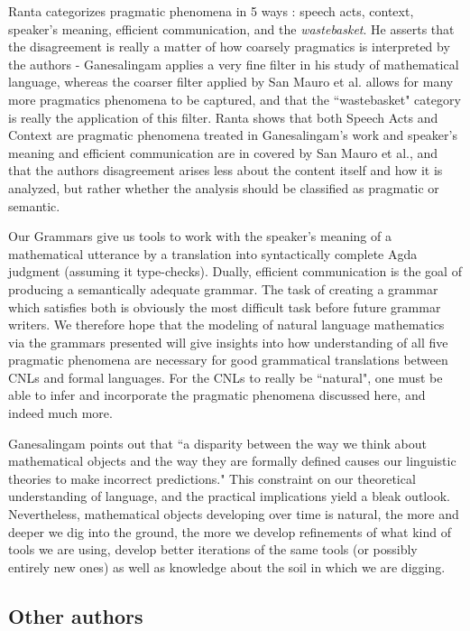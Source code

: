 Ranta categorizes pragmatic phenomena in 5 ways : speech acts, context,
speaker's meaning, efficient communication, and the \emph{wastebasket}. He
asserts that the disagreement is really a matter of how coarsely pragmatics is
interpreted by the authors - Ganesalingam applies a very fine filter in his
study of mathematical language, whereas the coarser filter applied by San Mauro
et al. allows for many more pragmatics phenomena to be captured, and that the
``wastebasket" category is really the application of this filter. Ranta shows
that both Speech Acts and Context are pragmatic phenomena treated in
Ganesalingam's work and speaker's meaning and efficient communication are in
covered by San Mauro et al., and that the authors disagreement arises less about
the content itself and how it is analyzed, but rather whether the analysis
should be classified as pragmatic or semantic.

Our Grammars give us tools to work with the speaker's meaning of a mathematical
utterance by a translation into syntactically complete Agda judgment (assuming
it type-checks). Dually, efficient communication is the goal of producing a
semantically adequate grammar. The task of creating a grammar which satisfies
both is obviously the most difficult task before future grammar writers. We
therefore hope that the modeling of natural language mathematics via the
grammars presented will give insights into how understanding of all five
pragmatic phenomena are necessary for good grammatical translations between CNLs
and formal languages. For the CNLs to really be ``natural", one must be able to
infer and incorporate the pragmatic phenomena discussed here, and indeed much
more.

Ganesalingam points out that ``a disparity between the way we think about
mathematical objects and the way they are formally defined causes our linguistic
theories to make incorrect predictions." This constraint on our theoretical
understanding of language, and the practical implications yield a bleak outlook.
Nevertheless, mathematical objects developing over time is natural, the more and
deeper we dig into the ground, the more we develop refinements of what kind of
tools we are using, develop better iterations of the same tools (or possibly
entirely new ones) as well as knowledge about the soil in which we are
digging.

\subsection{Other authors}

